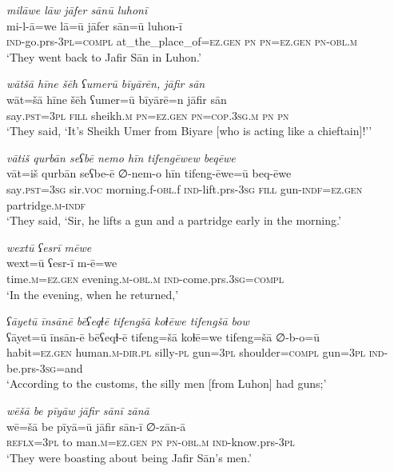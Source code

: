 \ea \label{ŠJ.13}
\textit{milāwe lāw jāfer sānū luhonī} \\ 
\gll mi-l-ā=we lā=ū jāfer sān=ū luhon-ī \\ 
 \textsc{ind-}go.prs\textsc{-3pl}\textsc{=compl} at\_the\_place\_of\textsc{=ez.gen} \textsc{pn} \textsc{pn}\textsc{=ez.gen} \textsc{pn}\textsc{-obl}\textsc{.m} \\ 
\glt `They went back to Jafir Sān in Luhon.'
\z 
 
\ea \label{ŠJ.15}
\textit{wātšā hīne šēh ʕumerū bīyārēn, jāfir sān} \\ 
\gll wāt=šā hīne šēh ʕumer=ū bīyārē=n jāfir sān \\ 
 say\textsc{.pst}\textsc{=3pl} \textsc{fill} sheikh\textsc{.m} \textsc{pn}\textsc{=ez.gen} \textsc{pn}\textsc{=cop}\textsc{.3sg}\textsc{.m} \textsc{pn} \textsc{pn} \\ 
\glt `They said, ‘It’s Sheikh Umer from Biyare [who is acting like a chieftain]!’'
\z 
 
\ea \label{ŠJ.17}
\textit{vātiš qurbān seʕbē nemo hīn tifengēwew beqēwe} \\ 
\gll vāt=iš qurbān seʕbe-ē ∅-nem-o hīn tifeng-ēwe=ū beq-ēwe \\ 
 say\textsc{.pst}\textsc{=3sg} sir.\textsc{voc} morning.f\textsc{-obl}.f \textsc{ind-}lift.prs\textsc{-3sg} \textsc{fill} gun\textsc{-indf}\textsc{=ez.gen} partridge\textsc{.m}\textsc{-indf} \\ 
\glt `They said, ‘Sir, he lifts a gun and a partridge early in the morning.'
\z 
 
\ea \label{ŠJ.27}
\textit{wextū ʕesrī mēwe} \\ 
\gll wext=ū ʕesr-ī m-ē=we \\ 
 time\textsc{.m}\textsc{=ez.gen} evening\textsc{.m}\textsc{-obl}\textsc{.m} \textsc{ind-}come.prs\textsc{.3sg}\textsc{=compl} \\ 
\glt `In the evening, when he returned,'
\z 
 
\ea \label{ŠJ.28}
\textit{ʕāyetū īnsānē bēʕeqɫē tifengšā koɫēwe tifengšā bow} \\ 
\gll ʕāyet=ū īnsān-ē bēʕeqɫ-ē tifeng=šā koɫē=we tifeng=šā ∅-b-o=ū \\ 
 habit\textsc{=ez.gen} human\textsc{.m}\textsc{-dir}\textsc{.pl} silly\textsc{\textsc{-pl}} gun\textsc{=3pl} shoulder\textsc{=compl} gun\textsc{=3pl} \textsc{ind-}be.prs\textsc{-3sg}=and \\ 
\glt `According to the customs, the silly men [from Luhon] had guns;'
\z 
 
\ea \label{ŠJ.29}
\textit{wēšā be pīyāw jāfir sānī zānā} \\ 
\gll wē=šā be pīyā=ū jāfir sān-ī ∅-zān-ā \\ 
 \textsc{reflx}\textsc{=3pl} to man\textsc{.m}\textsc{=ez.gen} \textsc{pn} \textsc{pn}\textsc{-obl}\textsc{.m} \textsc{ind-}know.prs\textsc{-3pl} \\ 
\glt `They were boasting about being Jafir Sān’s men.'
\z 
 
